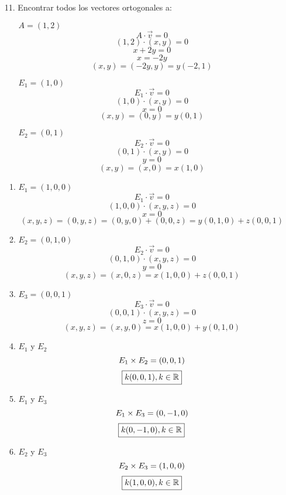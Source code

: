 \documentclass[../practica.root.tex]{subfiles}
\begin{document}
\begin{enumerate}
\begin{enumerate}
    \end{enumerate} 
    \item[11.] Encontrar todos los vectores ortogonales a:
    \begin{enumerate}
        \item[\textcolor{red}{\blacksquare}] \( A = (1,2) \)
        \[ A\cdot\vec{v} = 0 \]
        \[ (1, 2)\cdot(x, y) = 0 \]
        \[ x + 2y = 0 \]
        \[ x = -2y \]
        \[ (x, y) = (-2y, y) = \boxed{y(-2,1)} \]
        \item[\textcolor{green}{\blacksquare}] \( E_1 = (1,0) \)
        \[ E_1\cdot\vec{v} = 0 \]
        \[ (1, 0)\cdot(x, y) = 0 \]
        \[ x = 0 \]
        \[ (x, y) = (0, y) = \boxed{y(0, 1)} \]
        \item[\textcolor{blue}{\blacksquare}] \( E_2 = (0,1) \)
        \[ E_2\cdot\vec{v} = 0 \]
        \[ (0, 1)\cdot(x, y) = 0 \]
        \[ y = 0 \]
        \[ (x, y) = (x, 0) = \boxed{x(1, 0)} \]
    \end{enumerate}
    \begin{enumerate}
        \item \( E_1 = (1,0,0) \)
        \[ E_1\cdot\vec{v} = 0 \]
        \[ (1,0,0)\cdot(x,y,z) = 0 \]
        \[ x = 0 \]
        \[ (x,y,z) = (0,y,z) = (0,y,0) + (0,0,z) = \boxed{y(0,1,0) + z(0,0,1)} \]
        \item \( E_2 = (0,1,0) \)
        \[ E_2\cdot\vec{v} = 0 \]
        \[ (0,1,0)\cdot(x,y,z) = 0 \]
        \[ y = 0 \]
        \[ (x,y,z) = (x,0,z) = \boxed{x(1,0,0) + z(0,0,1)} \]
        \item \( E_3 = (0,0,1) \)
        \[ E_3\cdot\vec{v} = 0 \]
        \[ (0,0,1)\cdot(x,y,z) = 0 \]
        \[ z = 0 \]
        \[ (x,y,z) = (x,y,0) = \boxed{x(1,0,0) + y(0,1,0)} \]
        \item \(E_1\) y \(E_2\)
        \[ E_1\times E_2 = (0,0,1) \]
        \[ \boxed{k(0,0,1), k \in \mathbb{R}} \]
        \item \(E_1\) y \(E_3\)
        \[ E_1\times E_3 = (0,-1,0) \]
        \[ \boxed{k(0,-1,0), k \in \mathbb{R}} \]
        \item \(E_2\) y \(E_3\)
        \[ E_2\times E_3 = (1,0,0) \]
        \[ \boxed{k(1,0,0), k \in \mathbb{R}} \]
    \end{enumerate}
    \item[] 
\end{enumerate}
\end{document}
